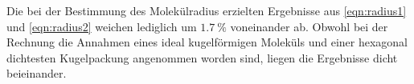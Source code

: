 Die bei der Bestimmung des Molekülradius erzielten Ergebnisse aus \eqref{eqn:radius1} und \eqref{eqn:radius2} weichen lediglich um $\SI{1.7}{\percent}$ voneinander ab.
Obwohl bei der Rechnung die Annahmen eines ideal kugelförmigen Moleküls und einer hexagonal dichtesten Kugelpackung
angenommen worden sind, liegen die Ergebnisse dicht beieinander.
